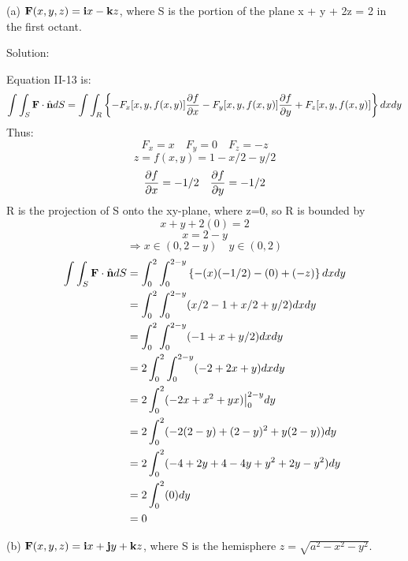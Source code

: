 \documentclass{article}
\begin{document}
\begin{enumerate}
    (a) $\textbf{F}(x,y,z) = \textbf{i}x - \textbf{k}z$, where S is the portion of the plane
    x + y + 2z = 2 in the first octant.

    Solution:

    Equation II-13 is:
    \[ \int\int_S \textbf{F} \cdot \hat{\textbf{n}} dS = \int\int_R \left\{ -F_x[x,y,f(x,y)]\frac{\partial{f}}{\partial{x}} - F_y[x,y,f(x,y)]\frac{\partial{f}}{\partial{y}} + F_z[x,y,f(x,y)] \right\} dxdy \]
    Thus:
    \[ F_x = x \quad F_y = 0 \quad F_z = -z \]
    \[ z = f(x,y) = 1 - x/2 - y/2 \]
    \[ \frac{\partial{f}}{\partial{x}} = -1/2 \quad \frac{\partial{f}}{\partial{y}} = -1/2 \]
    R is the projection of S onto the xy-plane, where z=0, so R is bounded by
    \[ x + y + 2(0) = 2 \]
    \[ x = 2-y \]
    \[ \Rightarrow x \in (0, 2-y) \quad y \in (0, 2) \]
    \begin{align*}
        \int\int_S \textbf{F} \cdot \hat{\textbf{n}} dS &= \int_0^2\int_0^{2-y} \left\{ -(x)(-1/2) - (0) + (-z) \right\} dxdy \\
        &= \int_0^2\int_0^{2-y} (x/2 - 1 + x/2 + y/2) dxdy \\
        &= \int_0^2\int_0^{2-y} (-1 + x + y/2) dxdy \\
        &= 2\int_0^2\int_0^{2-y} (-2 + 2x + y) dxdy \\
        &= 2\int_0^2 (-2x + x^2 + yx) \big{|}_0^{2-y} dy \\
        &= 2\int_0^2 (-2(2-y) + (2-y)^2 + y(2-y)) dy \\
        &= 2\int_0^2 (-4 +2y + 4 - 4y + y^2 + 2y-y^2) dy \\
        &= 2\int_0^2 (0) dy \\
        &= 0 \\
    \end{align*}

    (b) $ \textbf{F}(x,y,z) = \textbf{i}x + \textbf{j}y + \textbf{k}z $, where S is the hemisphere
    $ z = \sqrt{a^2 - x^2 - y^2}$.


\end{enumerate}
\end{document}
